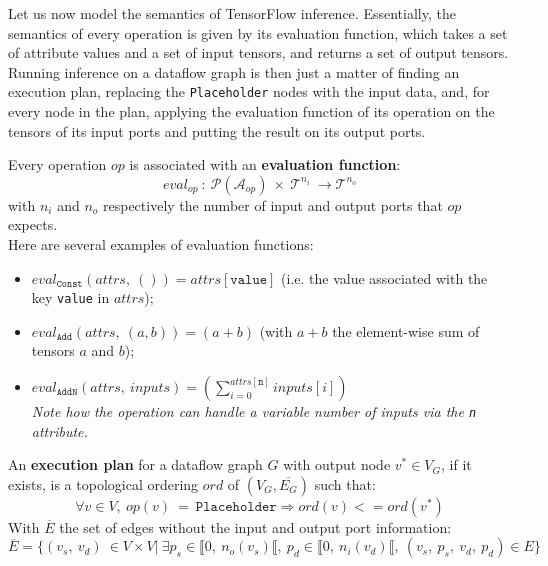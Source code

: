 \documentclass[11pt]{article}
\begin{document}
Let us now model the semantics of TensorFlow inference. Essentially, the semantics of every operation is given by its evaluation function, which takes a set of attribute values and a set of input tensors, and returns a set of output tensors. Running inference on a dataflow graph is then just a matter of finding an execution plan, replacing the \texttt{Placeholder} nodes with the input data, and, for every node in the plan, applying the evaluation function of its operation on the tensors of its input ports and putting the result on its output ports.\\

\begin{definition}Every operation $op$ is associated with an \textbf{evaluation function}:
$$eval_{op} \ :\ \mathcal{P}(\mathcal{A}_{op})\ \times \ \mathcal{T}^{n_i} \ \rightarrow \mathcal{T}^{n_o}$$
with $n_i$ and $n_o$ respectively the number of input and output ports that $op$ expects.\\

\noindent
Here are several examples of evaluation functions:
\begin{itemize}
    \item $eval_\texttt{Const}(attrs,\ ()) = attrs[\texttt{value}]$ (i.e. the value associated with the key \texttt{value} in $attrs$);
    \item $eval_\texttt{Add}(attrs,\ (a, b)) = (a + b)$ (with $a + b$ the element-wise sum of tensors $a$ and $b$);
    \item $eval_\texttt{AddN}(attrs,\ inputs) = \left( \sum_{i = 0}^{attrs[\texttt{n}]} inputs[i] \right)$\\ \textit{Note how the operation can handle a variable number of inputs via the \texttt{n} attribute.}\\
\end{itemize}
\end{definition}

\begin{definition}
An \textbf{execution plan} for a dataflow graph $G$ with output node $v^* \in V_G$, if it exists, is a topological ordering $ord$ of $(V_G, \overline{E_G})$ such that: $$\forall v \in V,\ op(v)\ =\ \texttt{Placeholder} \Rightarrow ord(v) <= ord(v^*)$$ With $\overline{E}$ the set of edges without the input and output port information: $$\overline{E} = \{(v_s,\ v_d)\ \in V \times V |\ \exists p_s \in \llbracket 0,\ n_o(v_s) \llbracket,\ p_d \in \llbracket 0,\ n_i(v_d) \llbracket,\ (v_s,\ p_s,\ v_d,\ p_d) \in E\}$$
\end{definition}
\end{document}
